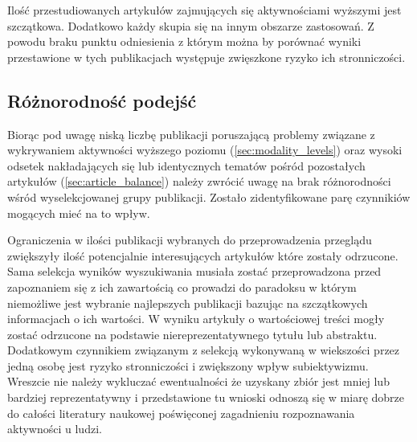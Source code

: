 Ilość przestudiowanych artykułów zajmujących się aktywnościami wyższymi jest szczątkowa. Dodatkowo każdy skupia się na innym obszarze zastosowań. Z powodu braku punktu odniesienia z którym można by porównać wyniki przestawione w tych publikacjach występuje zwięszkone ryzyko ich stronniczości. 

\subsection{Różnorodność podejść}
Biorąc pod uwagę niską liczbę publikacji poruszającą problemy związane z wykrywaniem aktywności wyższego poziomu (\ref{sec:modality_levels}) oraz wysoki odsetek nakładających się lub identycznych tematów pośród pozostałych artykułów (\ref{sec:article_balance}) należy zwrócić uwagę na brak różnorodności wśród wyselekcjowanej grupy publikacji. Zostało zidentyfikowane parę czynnikiów mogących mieć na to wpływ. 

Ograniczenia w ilości publikacji wybranych do przeprowadzenia przeglądu zwiększyły ilość potencjalnie interesujących artykułów które zostały odrzucone. Sama selekcja wyników wyszukiwania musiała zostać przeprowadzona przed zapoznaniem się z ich zawartością co prowadzi do paradoksu w którym niemożliwe jest wybranie najlepszych publikacji bazując na szczątkowych informacjach o ich wartości. W wyniku artykuły o wartościowej treści mogły zostać odrzucone na podstawie niereprezentatywnego tytułu lub abstraktu. Dodatkowym czynnikiem związanym z selekcją wykonywaną w wiekszości przez jedną osobę jest ryzyko stronniczości i zwiększony wpływ subiektywizmu. Wreszcie nie należy wykluczać ewentualności że uzyskany zbiór jest mniej lub bardziej reprezentatywny i przedstawione tu wnioski odnoszą się w miarę dobrze do całości literatury naukowej poświęconej zagadnieniu rozpoznawania aktywności u ludzi.
